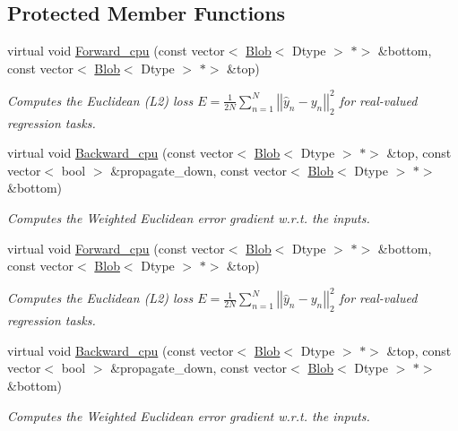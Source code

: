 \subsection*{Protected Member Functions}
\begin{DoxyCompactItemize}
\item 
virtual void \mbox{\hyperlink{classcaffe_1_1_weighted_euclidean_loss_layer_afec8ba4fe31b4b9581d58e9a829195aa}{Forward\+\_\+cpu}} (const vector$<$ \mbox{\hyperlink{classcaffe_1_1_blob}{Blob}}$<$ Dtype $>$ $\ast$$>$ \&bottom, const vector$<$ \mbox{\hyperlink{classcaffe_1_1_blob}{Blob}}$<$ Dtype $>$ $\ast$$>$ \&top)
\begin{DoxyCompactList}\small\item\em Computes the Euclidean (L2) loss $ E = \frac{1}{2N} \sum\limits_{n=1}^N \left| \left| \hat{y}_n - y_n \right| \right|_2^2 $ for real-\/valued regression tasks. \end{DoxyCompactList}\item 
virtual void \mbox{\hyperlink{classcaffe_1_1_weighted_euclidean_loss_layer_a03cab5c47d405a3ee513cc94b238e367}{Backward\+\_\+cpu}} (const vector$<$ \mbox{\hyperlink{classcaffe_1_1_blob}{Blob}}$<$ Dtype $>$ $\ast$$>$ \&top, const vector$<$ bool $>$ \&propagate\+\_\+down, const vector$<$ \mbox{\hyperlink{classcaffe_1_1_blob}{Blob}}$<$ Dtype $>$ $\ast$$>$ \&bottom)
\begin{DoxyCompactList}\small\item\em Computes the Weighted Euclidean error gradient w.\+r.\+t. the inputs. \end{DoxyCompactList}\item 
virtual void \mbox{\hyperlink{classcaffe_1_1_weighted_euclidean_loss_layer_adbd3351b9d5de823aa6f222051bfacd7}{Forward\+\_\+cpu}} (const vector$<$ \mbox{\hyperlink{classcaffe_1_1_blob}{Blob}}$<$ Dtype $>$ $\ast$$>$ \&bottom, const vector$<$ \mbox{\hyperlink{classcaffe_1_1_blob}{Blob}}$<$ Dtype $>$ $\ast$$>$ \&top)
\begin{DoxyCompactList}\small\item\em Computes the Euclidean (L2) loss $ E = \frac{1}{2N} \sum\limits_{n=1}^N \left| \left| \hat{y}_n - y_n \right| \right|_2^2 $ for real-\/valued regression tasks. \end{DoxyCompactList}\item 
virtual void \mbox{\hyperlink{classcaffe_1_1_weighted_euclidean_loss_layer_a322d61242f92d0ea8fb95d2c6391dccb}{Backward\+\_\+cpu}} (const vector$<$ \mbox{\hyperlink{classcaffe_1_1_blob}{Blob}}$<$ Dtype $>$ $\ast$$>$ \&top, const vector$<$ bool $>$ \&propagate\+\_\+down, const vector$<$ \mbox{\hyperlink{classcaffe_1_1_blob}{Blob}}$<$ Dtype $>$ $\ast$$>$ \&bottom)
\begin{DoxyCompactList}\small\item\em Computes the Weighted Euclidean error gradient w.\+r.\+t. the inputs. \end{DoxyCompactList}\end{DoxyCompactItemize}
